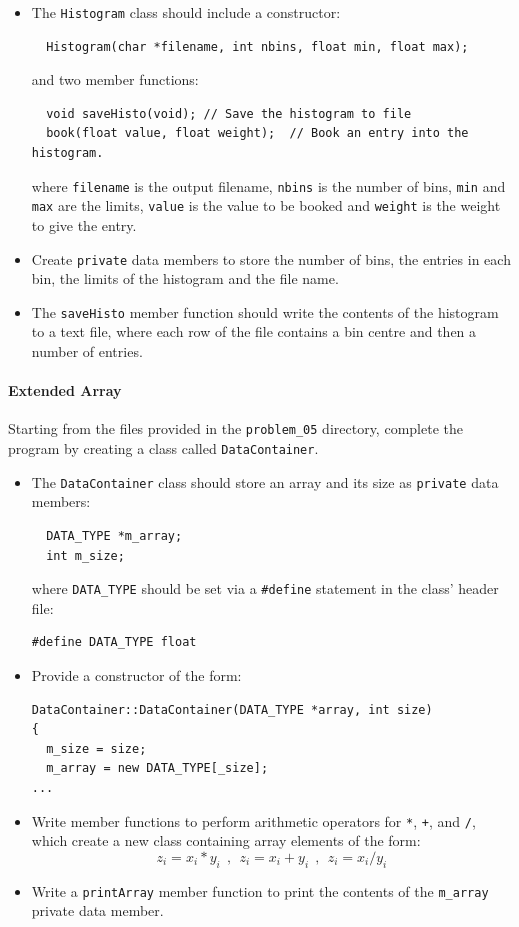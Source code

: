 \documentclass[11pt,a4paper]{scrartcl}
\begin{document}
\begin{itemize}
\item The \texttt{Histogram} class should include a constructor:
\begin{verbatim}
  Histogram(char *filename, int nbins, float min, float max);
\end{verbatim}
and two member functions:
\begin{verbatim}
  void saveHisto(void); // Save the histogram to file
  book(float value, float weight);  // Book an entry into the histogram.
\end{verbatim}
where \texttt{filename} is the output filename, \texttt{nbins} is the
number of bins, \texttt{min} and \texttt{max} are the limits,
\texttt{value} is the value to be booked and \texttt{weight} is the
weight to give the entry.

\item Create \texttt{private} data members to store the number of bins, the
entries in each bin, the limits of the histogram and the file name.

\item The \texttt{saveHisto} member function should write the contents
of the histogram to a text file, where each row of the file contains a
bin centre and then a number of entries.
\end{itemize}

\paragraph{Extended Array}
Starting from the files provided in the \texttt{problem\_05} directory,
complete the program by creating a class called
\texttt{DataContainer}.

\begin{itemize}
\item The \texttt{DataContainer} class should store an array and
its size as \texttt{private} data members:
\begin{verbatim}
  DATA_TYPE *m_array;
  int m_size;
\end{verbatim}
where \texttt{DATA\_TYPE} should be set via a \texttt{\#define}
statement in the class' header file:
\begin{verbatim}
#define DATA_TYPE float
\end{verbatim}

\item Provide a constructor of the form:
\begin{verbatim}
DataContainer::DataContainer(DATA_TYPE *array, int size)
{
  m_size = size;
  m_array = new DATA_TYPE[_size];
...
\end{verbatim}

\item Write member functions to perform arithmetic
operators for \texttt{*}, \texttt{+}, and \texttt{/}, which create a
new class containing array elements of the form:
\[z_i = x_i * y_i \:\:,\:\: z_i = x_i + y_i \:\:,\:\:  z_i = x_i /
y_i\]

\item Write a \texttt{printArray} member function to print the
contents of the \texttt{m\_array} private data member.
\end{itemize}
\end{document}
